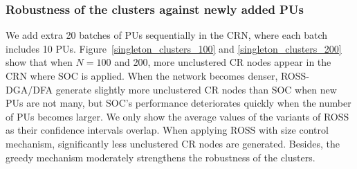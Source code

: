 \documentclass[10pt,journal,compsoc]{IEEEtran}
\theoremstyle{mytheoremstyle}
\theoremstyle{mytheoremstyle}
\theoremstyle{mytheoremstyle}
\begin{document}
\subsubsection{Robustness of the clusters against newly added PUs}
We add extra 20 batches of PUs sequentially in the CRN, where each batch includes 10 PUs. 
Figure~\ref{singleton_clusters_100} and \ref{singleton_clusters_200} show that when $N=100$ and 200, more unclustered CR nodes appear in the CRN where SOC is applied.
When the network becomes denser, ROSS-DGA/DFA generate slightly more unclustered CR nodes than SOC when new PUs are not many, but SOC's performance deteriorates quickly when the number of PUs becomes larger.
We only show the average values of the variants of ROSS as their confidence intervals overlap.
%
When applying ROSS with size control mechanism, significantly less unclustered CR nodes are generated.
Besides, the greedy mechanism moderately strengthens the robustness of the clusters.
%
%  
\end{document}
